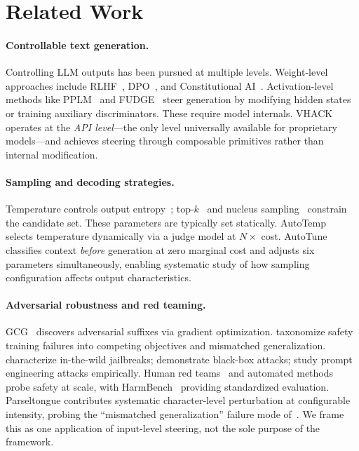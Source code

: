 \documentclass[11pt]{article}
\begin{document}
\section{Related Work}

\paragraph{Controllable text generation.}
Controlling LLM outputs has been pursued at multiple levels. Weight-level approaches include RLHF~\cite{ouyang2022training,stiennon2020learning}, DPO~\cite{rafailov2023direct}, and Constitutional AI~\cite{bai2022constitutional}. Activation-level methods like PPLM~\cite{dathathri2020plug} and FUDGE~\cite{yang2021fudge} steer generation by modifying hidden states or training auxiliary discriminators. These require model internals. VHACK operates at the \emph{API level}---the only level universally available for proprietary models---and achieves steering through composable primitives rather than internal modification.

\paragraph{Sampling and decoding strategies.}
Temperature controls output entropy~\cite{ackley1985learning}; top-$k$~\cite{fan2018hierarchical} and nucleus sampling~\cite{holtzman2020curious} constrain the candidate set. These parameters are typically set statically. AutoTemp~\cite{plinius2024autotemp} selects temperature dynamically via a judge model at $N\times$ cost. AutoTune classifies context \emph{before} generation at zero marginal cost and adjusts six parameters simultaneously, enabling systematic study of how sampling configuration affects output characteristics.

\paragraph{Adversarial robustness and red teaming.}
GCG~\cite{zou2023universal} discovers adversarial suffixes via gradient optimization. \citet{wei2023jailbroken} taxonomize safety training failures into competing objectives and mismatched generalization. \citet{shen2024anything} characterize in-the-wild jailbreaks; \citet{chao2023jailbreaking} demonstrate black-box attacks; \citet{liu2024jailbreaking} study prompt engineering attacks empirically. Human red teams~\cite{ganguli2022red} and automated methods~\cite{perez2022red} probe safety at scale, with HarmBench~\cite{mazeika2024harmbench} providing standardized evaluation. Parseltongue contributes systematic character-level perturbation at configurable intensity, probing the ``mismatched generalization'' failure mode of~\citet{wei2023jailbroken}. We frame this as one application of input-level steering, not the sole purpose of the framework.
\end{document}

